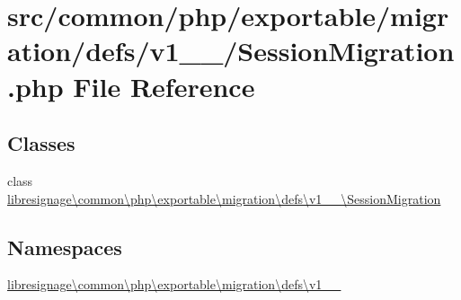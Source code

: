 \hypertarget{v1__1__0_2SessionMigration_8php}{}\section{src/common/php/exportable/migration/defs/v1\+\_\+\_/\+Session\+Migration.php File Reference}
\label{v1__1__0_2SessionMigration_8php}
\subsection*{Classes}
\begin{DoxyCompactItemize}
\item 
class \hyperlink{classlibresignage_1_1common_1_1php_1_1exportable_1_1migration_1_1defs_1_1v1__1__0_1_1SessionMigration}{libresignage\textbackslash{}common\textbackslash{}php\textbackslash{}exportable\textbackslash{}migration\textbackslash{}defs\textbackslash{}v1\+\_\+\_\textbackslash{}\+Session\+Migration}
\end{DoxyCompactItemize}
\subsection*{Namespaces}
\begin{DoxyCompactItemize}
\item 
 \hyperlink{namespacelibresignage_1_1common_1_1php_1_1exportable_1_1migration_1_1defs_1_1v1__1__0}{libresignage\textbackslash{}common\textbackslash{}php\textbackslash{}exportable\textbackslash{}migration\textbackslash{}defs\textbackslash{}v1\+\_\+\_}
\end{DoxyCompactItemize}
